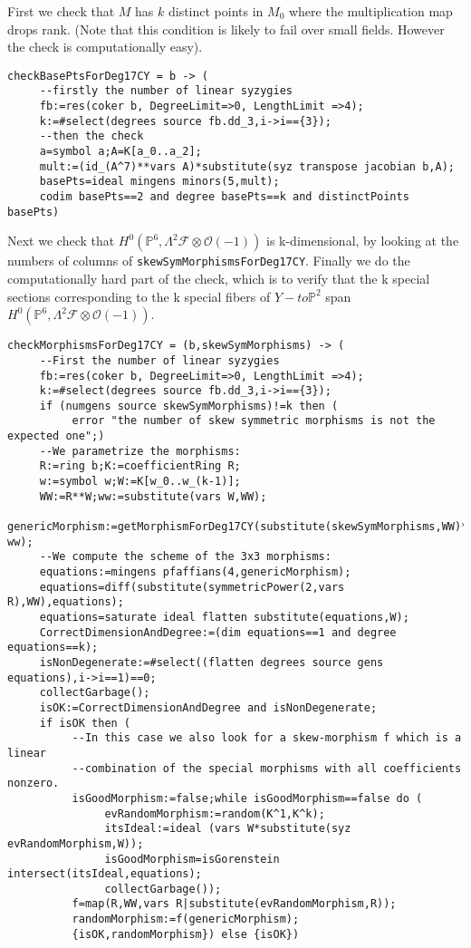 \documentclass[12pt,leqno]{amsart}
\newcommand{\PP}{{\mathbb P}}
\newcommand{\kf}{{\mathcal F}}
\newcommand{\ko}{{\mathcal O}}
\newcommand{\tensor}{\otimes}
\begin{document}
First we check that $M$ has $k$ distinct points in $M_0$ where 
the multiplication map drops rank. 
(Note that this condition is likely to fail over small fields. 
However the check is computationally easy).
{\scriptsize
\begin{verbatim} 
checkBasePtsForDeg17CY = b -> (
     --firstly the number of linear syzygies
     fb:=res(coker b, DegreeLimit=>0, LengthLimit =>4);
     k:=#select(degrees source fb.dd_3,i->i=={3});
     --then the check
     a=symbol a;A=K[a_0..a_2];
     mult:=(id_(A^7)**vars A)*substitute(syz transpose jacobian b,A);
     basePts=ideal mingens minors(5,mult);
     codim basePts==2 and degree basePts==k and distinctPoints basePts)
\end{verbatim}}
Next we check that $H^0(\PP^6,\Lambda^2 \kf \tensor \ko(-1))$ is k-dimensional,
by looking at the numbers of columns of {\tt skewSymMorphismsForDeg17CY}.
Finally we do the computationally hard part of the check, which is to
verify that the k special sections corresponding to the k special
fibers of $Y -to \PP^2$ span $H^0(\PP^6,\Lambda^2 \kf \tensor \ko(-1))$.
{\scriptsize
\begin{verbatim} 
checkMorphismsForDeg17CY = (b,skewSymMorphisms) -> (
     --First the number of linear syzygies
     fb:=res(coker b, DegreeLimit=>0, LengthLimit =>4);
     k:=#select(degrees source fb.dd_3,i->i=={3});
     if (numgens source skewSymMorphisms)!=k then (
          error "the number of skew symmetric morphisms is not the expected one";)
     --We parametrize the morphisms:    
     R:=ring b;K:=coefficientRing R;     
     w:=symbol w;W:=K[w_0..w_(k-1)];
     WW:=R**W;ww:=substitute(vars W,WW);
     genericMorphism:=getMorphismForDeg17CY(substitute(skewSymMorphisms,WW)*transpose ww);
     --We compute the scheme of the 3x3 morphisms:
     equations:=mingens pfaffians(4,genericMorphism);
     equations=diff(substitute(symmetricPower(2,vars R),WW),equations);
     equations=saturate ideal flatten substitute(equations,W);
     CorrectDimensionAndDegree:=(dim equations==1 and degree equations==k);
     isNonDegenerate:=#select((flatten degrees source gens equations),i->i==1)==0;
     collectGarbage();
     isOK:=CorrectDimensionAndDegree and isNonDegenerate;
     if isOK then (
          --In this case we also look for a skew-morphism f which is a linear
          --combination of the special morphisms with all coefficients nonzero.
          isGoodMorphism:=false;while isGoodMorphism==false do (
               evRandomMorphism:=random(K^1,K^k);
               itsIdeal:=ideal (vars W*substitute(syz evRandomMorphism,W));
               isGoodMorphism=isGorenstein intersect(itsIdeal,equations);
               collectGarbage());
          f=map(R,WW,vars R|substitute(evRandomMorphism,R));
          randomMorphism:=f(genericMorphism);
          {isOK,randomMorphism}) else {isOK})
\end{verbatim}}
\end{document}
